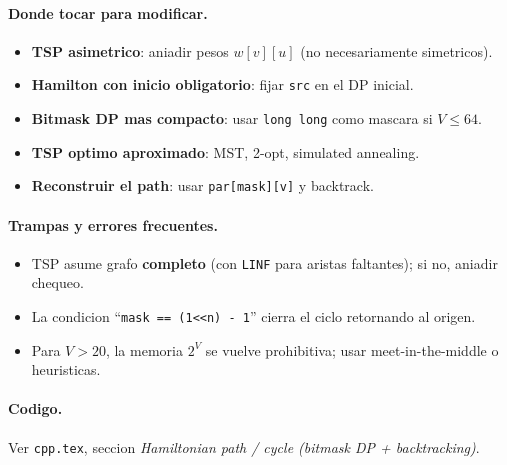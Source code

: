 \paragraph{Donde tocar para modificar.}
\begin{itemize}\setlength\itemsep{0pt}
	\item \textbf{TSP asimetrico}: aniadir pesos $w[v][u]$ (no necesariamente simetricos).
	\item \textbf{Hamilton con inicio obligatorio}: fijar \texttt{src} en el DP inicial.
	\item \textbf{Bitmask DP mas compacto}: usar \texttt{long long} como mascara si $V \le 64$.
	\item \textbf{TSP optimo aproximado}: MST, 2-opt, simulated annealing.
	\item \textbf{Reconstruir el path}: usar \texttt{par[mask][v]} y backtrack.
\end{itemize}

\paragraph{Trampas y errores frecuentes.}
\begin{itemize}\setlength\itemsep{0pt}
	\item TSP asume grafo \textbf{completo} (con \texttt{LINF} para aristas faltantes); si no, aniadir chequeo.
	\item La condicion ``\texttt{mask == (1<<n) - 1}'' cierra el ciclo retornando al origen.
	\item Para $V > 20$, la memoria $2^V$ se vuelve prohibitiva; usar meet-in-the-middle o heuristicas.
\end{itemize}

\paragraph{Codigo.}
Ver \texttt{cpp.tex}, seccion \textit{Hamiltonian path / cycle (bitmask DP + backtracking)}.
